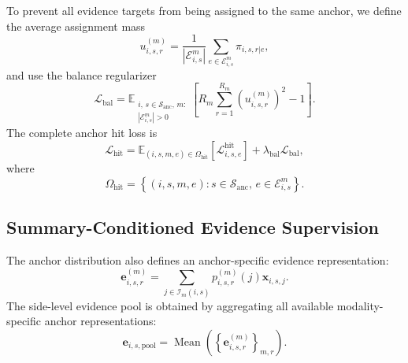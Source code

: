 To prevent all evidence targets from being assigned to the same anchor, we define the average assignment mass
\begin{equation}
    u_{i,s,r}^{(m)}
    =
    \frac{1}{
        \left|
            \mathcal{E}_{i,s}^{m}
        \right|
    }
    \sum_{e \in \mathcal{E}_{i,s}^{m}}
    \pi_{i,s,r|e},
\label{eq:app-assignment-mass}
\end{equation}
and use the balance regularizer
\begin{equation}
    \mathcal{L}_{\mathrm{bal}}
    =
    \mathbb{E}_{
        \substack{
            i,\,
            s \in \mathcal{S}_{\mathrm{anc}},\,
            m:\\
            |\mathcal{E}_{i,s}^{m}|>0
        }
    }
    \left[
        R_m
        \sum_{r=1}^{R_m}
        \left(
            u_{i,s,r}^{(m)}
        \right)^2
        -
        1
    \right].
\label{eq:app-balance-loss}
\end{equation}
The complete anchor hit loss is
\begin{equation}
    \mathcal{L}_{\mathrm{hit}}
    =
    \mathbb{E}_{
        (i,s,m,e)
        \in
        \Omega_{\mathrm{hit}}
    }
    \left[
        \mathcal{L}_{i,s,e}^{\mathrm{hit}}
    \right]
    +
    \lambda_{\mathrm{bal}}
    \mathcal{L}_{\mathrm{bal}},
\label{eq:app-complete-hit-loss}
\end{equation}
where
\begin{equation}
    \Omega_{\mathrm{hit}}
    =
    \left\{
        (i,s,m,e):
        s \in \mathcal{S}_{\mathrm{anc}},
        \,
        e \in \mathcal{E}_{i,s}^{m}
    \right\}.
\end{equation}

\subsection{Summary-Conditioned Evidence Supervision}
\label{app:summary-conditioned-evidence}

The anchor distribution also defines an anchor-specific evidence representation:
\begin{equation}
    \mathbf{e}_{i,s,r}^{(m)}
    =
    \sum_{j \in \mathcal{I}_m(i,s)}
    p_{i,s,r}^{(m)}(j)
    \mathbf{x}_{i,s,j}.
\label{eq:app-anchor-evidence-pool}
\end{equation}
The side-level evidence pool is obtained by aggregating all available modality-specific anchor representations:
\begin{equation}
    \mathbf{e}_{i,s,\mathrm{pool}}
    =
    \operatorname{Mean}
    \left(
        \left\{
            \mathbf{e}_{i,s,r}^{(m)}
        \right\}_{m,r}
    \right).
\label{eq:app-side-evidence-pool}
\end{equation}

